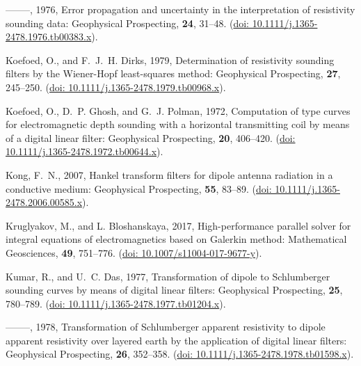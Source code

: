 \documentclass[paper,twocolumn,twoside]{geophysics}
\begin{document}
\begin{thebibliography}{}
--------, 1976, Error propagation and uncertainty in the interpretation of
  resistivity sounding data: Geophysical Prospecting, {\bf 24}, 31--48.
\newblock (\href{http://doi.org/10.1111/j.1365-2478.1976.tb00383.x}{doi:
  10.1111/j.1365-2478.1976.tb00383.x}).

Koefoed, O., and F.~J.~H. Dirks,  1979, Determination of resistivity sounding
  filters by the {W}iener-{H}opf least-squares method: Geophysical Prospecting,
  {\bf 27}, 245--250.
\newblock (\href{http://doi.org/10.1111/j.1365-2478.1979.tb00968.x}{doi:
  10.1111/j.1365-2478.1979.tb00968.x}).

Koefoed, O., D.~P. Ghosh, and G.~J. Polman,  1972, Computation of type curves
  for electromagnetic depth sounding with a horizontal transmitting coil by
  means of a digital linear filter: Geophysical Prospecting, {\bf 20},
  406--420.
\newblock (\href{http://doi.org/10.1111/j.1365-2478.1972.tb00644.x}{doi:
  10.1111/j.1365-2478.1972.tb00644.x}).

Kong, F.~N.,  2007, Hankel transform filters for dipole antenna radiation in a
  conductive medium: Geophysical Prospecting, {\bf 55}, 83--89.
\newblock (\href{http://doi.org/10.1111/j.1365-2478.2006.00585.x}{doi:
  10.1111/j.1365-2478.2006.00585.x}).

Kruglyakov, M., and L. Bloshanskaya,  2017, High-performance parallel solver
  for integral equations of electromagnetics based on {G}alerkin method:
  Mathematical Geosciences, {\bf 49}, 751--776.
\newblock (\href{https://doi.org/10.1007/s11004-017-9677-y}{doi:
  10.1007/s11004-017-9677-y}).

Kumar, R., and U.~C. Das,  1977, Transformation of dipole to {S}chlumberger
  sounding curves by means of digital linear filters: Geophysical Prospecting,
  {\bf 25}, 780--789.
\newblock (\href{http://doi.org/10.1111/j.1365-2478.1977.tb01204.x}{doi:
  10.1111/j.1365-2478.1977.tb01204.x}).

--------, 1978, Transformation of {S}chlumberger apparent resistivity to dipole
  apparent resistivity over layered earth by the application of digital linear
  filters: Geophysical Prospecting, {\bf 26}, 352--358.
\newblock (\href{http://doi.org/10.1111/j.1365-2478.1978.tb01598.x}{doi:
  10.1111/j.1365-2478.1978.tb01598.x}).


\end{thebibliography}
\end{document}
